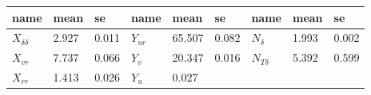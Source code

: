 \documentclass[review]{elsarticle}
\begin{document}
 \begin{savenotes}\sphinxattablestart
 \centering
 \sphinxthecaptionisattop
 \label{\detokenize{06.10_results_wpcc:wpcc-derivatives}}
 \sphinxaftertopcaption
 \begin{tabulary}{\linewidth}[t]{|T|T|T|T|T|T|T|T|T|}
 \hline
 \sphinxstyletheadfamily 
 
 name
 &\sphinxstyletheadfamily 
 
 mean
 &\sphinxstyletheadfamily 
 
 se
 &\sphinxstyletheadfamily 
 
 name
 &\sphinxstyletheadfamily 
 
 mean
 &\sphinxstyletheadfamily 
 
 se
 &\sphinxstyletheadfamily 
 
 name
 &\sphinxstyletheadfamily 
 
 mean
 &\sphinxstyletheadfamily 
 
 se
 \\
 \hline
 
 \( X_{\delta\delta} \)
 &
 
 \sphinxhyphen{}2.927
 &
 
 0.011
 &
 
 \( Y_{ur} \)
 &
 
 \sphinxhyphen{}65.507
 &
 
 0.082
 &
 
 \( N_{\delta} \)
 &
 
 \sphinxhyphen{}1.993
 &
 
 0.002
 \\
 \hline
 
 \( X_{vr} \)
 &
 
 \sphinxhyphen{}7.737
 &
 
 0.066
 &
 
 \( Y_{v} \)
 &
 
 \sphinxhyphen{}20.347
 &
 
 0.016
 &
 
 \( N_{T\delta} \)
 &
 
 \sphinxhyphen{}5.392
 &
 
 0.599
 \\
 \hline
 
 \( X_{rr} \)
 &
 
 \sphinxhyphen{}1.413
 &
 
 0.026
 &
 
 \( Y_{u} \)
 &
 
 \sphinxhyphen{}0.027
 &
 

\end{tabulary}
\end{savenotes}
\end{document}
